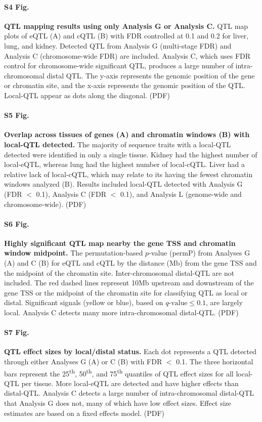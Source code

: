 \documentclass[10pt,letterpaper]{article}
\begin{document}
\paragraph*{S4 Fig.}
\label{S_grid_plot_lenient}
{\bf QTL mapping results using only Analysis G or Analysis C.}
QTL map plots of eQTL (A) and cQTL (B) with FDR controlled at 0.1 and 0.2 for liver, lung, and kidney. Detected QTL from Analysis G (multi-stage FDR) and Analysis C (chromosome-wide FDR) are included. Analysis C, which uses FDR control for chromosome-wide significant QTL, produces a large number of intra-chromosomal distal QTL. The y-axis represents the genomic position of the gene or chromatin site, and the x-axis represents the genomic position of the QTL. Local-QTL appear as dots along the diagonal. (PDF)

\paragraph*{S5 Fig.}
\label{S_upset_qtl}
{\bf Overlap across tissues of genes (A) and chromatin windows (B) with local-QTL detected.} 
The majority of sequence traits with a local-QTL detected were identified in only a single tissue. Kidney had the highest number of local-eQTL, whereas lung had the highest number of local-cQTL. Liver had a relative lack of local-cQTL, which may relate to its having the fewest chromatin windows analyzed (B). Results included local-QTL detected with Analysis G (FDR $<$ 0.1), Analysis C (FDR $<$ 0.1), and Analysis L (genome-wide and chromosome-wide). (PDF)

\paragraph*{S6 Fig.}
\label{S_dist}
{\bf Highly significant QTL map nearby the gene TSS and chromatin window midpoint.}
The permutation-based $p$-value (permP) from Analyses G (A) and C (B) for eQTL and cQTL by the distance (Mb) from the gene TSS and the midpoint of the chromatin site. Inter-chromosomal distal-QTL are not included. The red dashed lines represent 10Mb upstream and downstream of the gene TSS or the midpoint of the chromatin site for classifying QTL as local or distal. Significant signals (yellow or blue), based on $q\text{-value} \le 0.1$, are largely local. Analysis C detects many more intra-chromosomal distal-QTL. (PDF)

\paragraph*{S7 Fig.}
\label{S_effect_size_status}
{\bf QTL effect sizes by local/distal status.}
Each dot represents a QTL detected through either Analyses G (A) or C (B) with FDR $<$ 0.1. The three horizontal bars represent the 25\textsuperscript{th}, 50\textsuperscript{th}, and 75\textsuperscript{th} quantiles of QTL effect sizes for all local-QTL per tissue. More local-eQTL are detected and have higher effects than distal-QTL. Analysis C detects a large number of intra-chromosomal distal-QTL that Analysis G does not, many of which have low effect sizes. Effect size estimates are based on a fixed effects model. (PDF)
\end{document}
